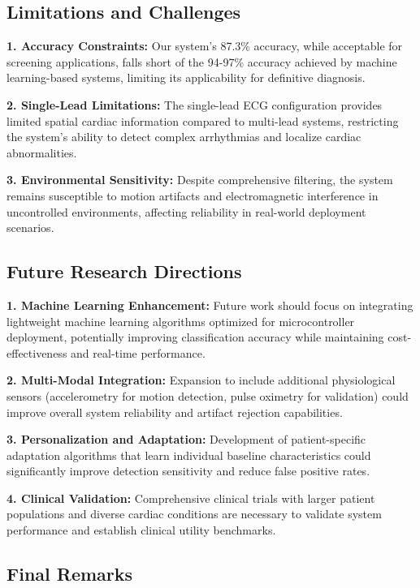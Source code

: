 \documentclass[12pt,a4paper]{article}
\begin{document}
\subsection{Limitations and Challenges}

\textbf{1. Accuracy Constraints:}
Our system's 87.3\% accuracy, while acceptable for screening applications, falls short of the 94-97\% accuracy achieved by machine learning-based systems, limiting its applicability for definitive diagnosis.

\textbf{2. Single-Lead Limitations:}
The single-lead ECG configuration provides limited spatial cardiac information compared to multi-lead systems, restricting the system's ability to detect complex arrhythmias and localize cardiac abnormalities.

\textbf{3. Environmental Sensitivity:}
Despite comprehensive filtering, the system remains susceptible to motion artifacts and electromagnetic interference in uncontrolled environments, affecting reliability in real-world deployment scenarios.

\subsection{Future Research Directions}

\textbf{1. Machine Learning Enhancement:}
Future work should focus on integrating lightweight machine learning algorithms optimized for microcontroller deployment, potentially improving classification accuracy while maintaining cost-effectiveness and real-time performance.

\textbf{2. Multi-Modal Integration:}
Expansion to include additional physiological sensors (accelerometry for motion detection, pulse oximetry for validation) could improve overall system reliability and artifact rejection capabilities.

\textbf{3. Personalization and Adaptation:}
Development of patient-specific adaptation algorithms that learn individual baseline characteristics could significantly improve detection sensitivity and reduce false positive rates.

\textbf{4. Clinical Validation:}
Comprehensive clinical trials with larger patient populations and diverse cardiac conditions are necessary to validate system performance and establish clinical utility benchmarks.

\subsection{Final Remarks}
\end{document}
